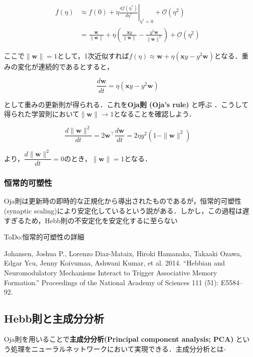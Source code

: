 \begin{align}
f(\eta)&\approx f(0) + \eta \left.\frac{df(\eta^*)}{d\eta^*}\right|_{\eta^*=0} + \mathcal{O}(\eta^2)\\
&=\frac{\mathbf{w}}{\|\mathbf{w}\|} + \eta \left(\frac{\mathbf{x}y}{\|\mathbf{w}\|}-\frac{y^2\mathbf{w}}{\|\mathbf{w}\|^3}\right)+ \mathcal{O}(\eta^2)
\end{align}


ここで$\|\mathbf{w}\|=1$として，1次近似すれば$f(\eta)\approx \mathbf{w} + \eta \left(\mathbf{x}y-y^2 \mathbf{w}\right)$となる．重みの変化が連続的であるとすると，


\begin{equation}
\frac{d\mathbf{w}}{dt} = \eta \left(\mathbf{x}y-y^2 \mathbf{w}\right)
\end{equation}


として重みの更新則が得られる．これを\textbf{Oja則 (Oja's rule)} と呼ぶ \citep{Oja1982-yd}．こうして得られた学習則において$\|\mathbf{w}\|\to 1$となることを確認しよう．


\begin{equation}
\frac{d\|\mathbf{w}\|^2}{dt}=2\mathbf{w}^\top\frac{d\mathbf{w}}{dt}= 2\eta y^2\left(1-\|\mathbf{w}\|^2\right)
\end{equation}


より，$\dfrac{d\|\mathbf{w}\|^2}{dt}=0$のとき，$\|\mathbf{w}\|= 1$となる．
\subsubsection{恒常的可塑性}
Oja則は更新時の即時的な正規化から導出されたものであるが，恒常的可塑性 (synaptic scaling)により安定化しているという説がある\citep{Turrigiano2008-lm}\citep{Yee2017-fb}．しかし，この過程は遅すぎるため，Hebb則の不安定化を安定化するに至らない\citep{Zenke2017-el}

ToDo:恒常的可塑性の詳細

Johansen, Joshua P., Lorenzo Diaz-Mataix, Hiroki Hamanaka, Takaaki Ozawa, Edgar Ycu, Jenny Koivumaa, Ashwani Kumar, et al. 2014. “Hebbian and Neuromodulatory Mechanisms Interact to Trigger Associative Memory Formation.” Proceedings of the National Academy of Sciences 111 (51): E5584–92.
\subsection{Hebb則と主成分分析}
Oja則を用いることで\textbf{主成分分析(Principal component analysis; PCA)} という処理をニューラルネットワークにおいて実現できる．主成分分析とは-

